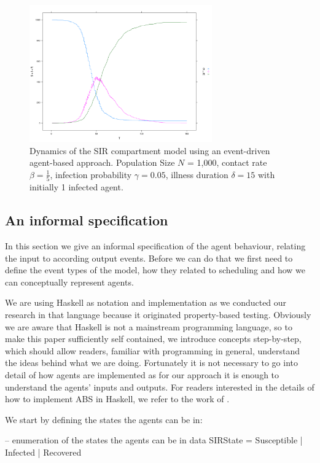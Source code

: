\begin{figure}
	\centering
	\includegraphics[width=0.7\textwidth, angle=0]{./fig/sir_eventdriven.png}
	\caption{Dynamics of the SIR compartment model using an event-driven agent-based approach. Population Size $N$ = 1,000, contact rate $\beta =  \frac{1}{5}$, infection probability $\gamma = 0.05$, illness duration $\delta = 15$ with initially 1 infected agent.}
	\label{fig:sir_sd_dynamics}
\end{figure}

\subsection{An informal specification}
In this section we give an informal specification of the agent behaviour, relating the input to according output events. Before we can do that we first need to define the event types of the model, how they related to scheduling and how we can conceptually represent agents.

We are using Haskell as notation and implementation as we conducted our research in that language because it originated property-based testing. Obviously we are aware that Haskell is not a mainstream programming language, so to make this paper sufficiently self contained, we introduce concepts step-by-step, which should allow readers, familiar with programming in general, understand the ideas behind what we are doing. Fortunately it is not necessary to go into detail of how agents are implemented as for our approach it is enough to understand the agents' inputs and outputs. For readers interested in the details of how to implement ABS in Haskell, we refer to the work of \cite{thaler_pure_2018}.

We start by defining the states the agents can be in:

\begin{HaskellCode}
-- enumeration of the states the agents can be in
data SIRState = Susceptible | Infected | Recovered
\end{HaskellCode}


